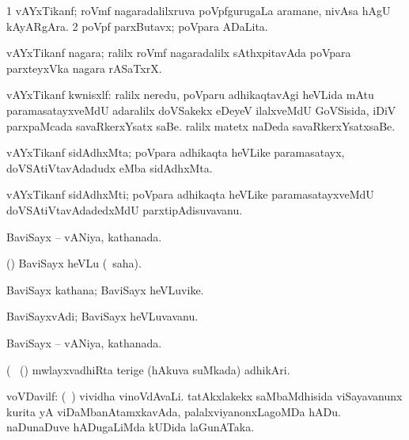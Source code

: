 \bentry
{} 
\gl{\nA}
\expl{}
\bmng
\bnum
\num{1} vAYxTikanf; roVmf nagaradalilxruva poVpfgurugaLa aramane, nivAsa hAgU kAyARgAra. 
\num{2} poVpf parxButavx; poVpara ADaLita. 
\enum
\emng
\eentry

\bentry
{}
\gl{\nA}
\expl{}
\bmng
 vAYxTikanf nagara; ralilx roVmf nagaradalilx sAthxpitavAda poVpara parxteyxVka nagara rASaTxrX. 
\emng
\eentry

\bentry
{}
\gl{\nA}
\expl{}
\bmng
 vAYxTikanf kwnisxlf: 
\banum
{} ralilx neredu, poVparu adhikaqtavAgi heVLida mAtu paramasatayxveMdU adaralilx doVSakekx eDeyeV ilalxveMdU GoVSisida, iDiV parxpaMcada savaRkerxYsatx saBe. 
 ralilx matetx naDeda savaRkerxYsatxsaBe. 
\eanum
\emng
\eentry

\bentry
{} 
\gl{\nA}
\expl{}
\bmng
 vAYxTikanf sidAdhxMta; poVpara adhikaqta heVLike paramasatayx, doVSAtiVtavAdadudx eMba sidAdhxMta. 
\emng
\eentry

\bentry
{} 
\gl{\nA}
\expl{}
\bmng
 vAYxTikanf sidAdhxMti; poVpara adhikaqta heVLike paramasatayxveMdU doVSAtiVtavAdadedxMdU parxtipAdisuvavanu. 
\emng
\eentry

\bentry
{} 
\gl{\gu}
\expl{}
\bmng
 BaviSayx -- vANiya, kathanada. 
\emng
\eentry

\bentry
{} 
\gl{\sakirx}
\expl{}
\bmng
 (\aupa) BaviSayx heVLu (\akirx\ saha). 
\emng
\eentry

\bentry
{} 
\gl{\nA}
\expl{}
\bmng
 BaviSayx kathana; BaviSayx heVLuvike. 
\emng
\eentry

\bentry
{} 
\gl{\nA}
\expl{}
\bmng
 BaviSayxvAdi; BaviSayx heVLuvavanu. 
\emng
\eentry

\bentry
{} 
\gl{\gu}
\expl{}
\bmng
 BaviSayx -- vANiya, kathanada. 
\emng
\eentry

\bentry
{} 
\gl{\nA}(\bava\ 
\bmng
 (\AmA) mwlayxvadhiRta terige (hAkuva suMkada) adhikAri. 
\emng
\eentry

\bentry
{} 
\gl{\nA}
\expl{}
\bmng
 voVDavilf: 
\banum
{} (\kanmu\ \ame) vividha vinoVdAvaLi. 
 tatAkxlakekx saMbaMdhisida viSayavanunx kurita yA viDaMbanAtamxkavAda, palalxviyanonxLagoMDa hADu. 
 naDunaDuve hADugaLiMda kUDida laGunATaka. 
\eanum
\emng
\eentry

